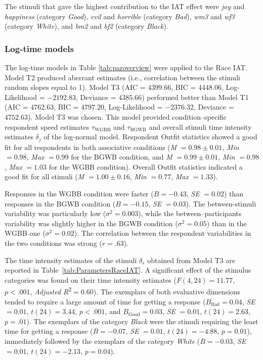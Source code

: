 \documentclass[12pt]{book}
\begin{document}
	The stimuli that gave the highest contribution to the IAT effect were \emph{joy} and \emph{happiness} (category \emph{Good}), \emph{evil} and \emph{horrible} (category \emph{Bad}), \emph{wm3} and \emph{wf3} (category \emph{White}), and \emph{bm2} and \emph{bf2} (category \emph{Black}). 

\subsubsection{Log-time models} 
The log-time models in Table \ref{tab:paroverview} were applied to the Race IAT. 
Model T2 produced aberrant estimates (i.e., correlation between the stimuli random slopes equal to 1). Model T3 (AIC = $4399.66$, BIC = $4448.06$, Log-Likelihood = $-2192.83$, Deviance = $4385.66$) performed better than Model T1 (AIC = $4762.63$, BIC = $4797.20$, Log-Likelihood = $-2376.32$, Deviance = $4752.63$). Model T3 was chosen. This model provided condition--specific respondent speed estimates $\tau_{\text{WGBB}}$ and $\tau_{\text{BGWB}}$ and overall stimuli time intensity estimates $\delta_j$ of the log-normal model.
Respondent Outfit statistics showed a good fit for all respondents in both associative conditions (\emph{M} $= 0.98 \pm 0.01$, \emph{Min} $= 0.98$, \emph{Max} $= 0.99$ for the BGWB condition, and \emph{M} $= 0.99 \pm 0.01$, \emph{Min} $=
0.98$, \emph{Max} $= 1.03$ for the WGBB condition). Overall Outfit statistics indicated a good fit for all stimuli (\emph{M} $= 1.00 \pm 0.16$, \emph{Min} $= 0.77$, \emph{Max} $= 1.33$). 

Responses in the WGBB condition were faster ($B = -0.43$, \emph{SE} $= 0.02$) than responses in the BGWB condition ($B = -0.15$, \emph{SE} $= 0.03$). The between-stimuli variability was particularly low ($\sigma^2 = 0.003$), while the between--participants variability was slightly higher in the BGWB condition ($\sigma^2 = 0.05$) than in the WGBB one ($\sigma^2 = 0.02$). The correlation between the respondent variabilities in the two conditions was strong ($r = .63$).

The time intensity estimates of the stimuli $\delta_s$ obtained from Model T3 are reported in Table~\ref{tab:ParametersRaceIAT}. 
A significant effect of the stimulus categories was found on their time intensity estimates ($F(4, 24)=11.77$, $p<.001$, \emph{Adjusted R}\textsuperscript{2}$= 0.60$). 
	The exemplars of both evaluative dimensions tended to require a large amount of time for getting a response ($B_{\text{Bad}}=0.04$, \emph{SE} $=0.01$, $t(24) = 3.44$, $p < .001$, and $B_{\text{Good}}= 0.03$, \emph{SE} $=0.01$, $t(24) = 2.63$, $p = .01$). 
	The exemplars of the category \emph{Black} were the stimuli requiring the least time for getting a response ($B=-0.07$, \emph{SE} $=0.01$, $t(24) = -4.88$, $p = 0.01$), immediately followed by the exemplars of the category \emph{White} ($B=-0.03$, \emph{SE} $=0.01$, $t(24) = -2.13$, $p = 0.04$). 
\end{document}
